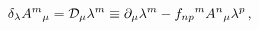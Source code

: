 \begin{equation}
\delta_{\lambda} A^{m}{}_{\mu} = {\cal D}_{\mu} \lambda^{m}
                                 \equiv\partial_{\mu} \lambda^{m}
                              -f_{np}{}^{m} A^{n}{}_{\mu} \lambda^{p} \, ,
\end{equation}

